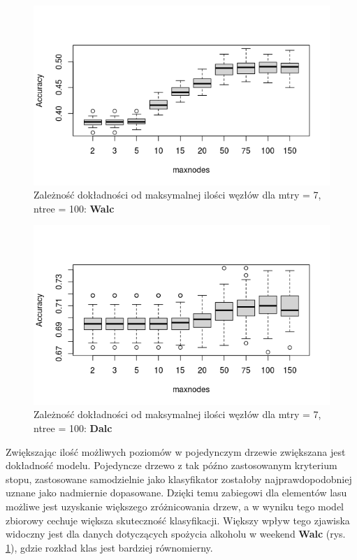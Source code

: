 \begin{figure}[h]
     \centering 
     \includegraphics[scale=0.80]{tex/W_maxnodes.png}
     \caption{Zależność dokładności od maksymalnej ilości węzłów dla mtry = 7, ntree = 100: \textbf{Walc}}
     \label{fig:W_maxnodes}
\end{figure}
\begin{figure}[t]
     \centering 
     \includegraphics[scale=0.80]{tex/D_nodes.png}
     \caption{Zależność dokładności od maksymalnej ilości węzłów dla mtry = 7, ntree = 100: \textbf{Dalc}}
      \label{fig:D_maxnodes}
\end{figure}
\FloatBarrier
Zwiększając ilość możliwych poziomów w pojedynczym drzewie zwiększana jest dokładność modelu. Pojedyncze drzewo z tak późno zastosowanym kryterium stopu, zastosowane samodzielnie jako klasyfikator zostałoby najprawdopodobniej uznane jako nadmiernie dopasowane. Dzięki temu zabiegowi dla elementów lasu możliwe jest uzyskanie większego zróżnicowania drzew, a w wyniku tego model zbiorowy cechuje większa skuteczność klasyfikacji. Większy wpływ tego zjawiska widoczny jest dla danych dotyczących spożycia alkoholu w weekend \textbf{Walc} (rys. \ref{fig:W_maxnodes}), gdzie rozkład klas jest bardziej równomierny.
